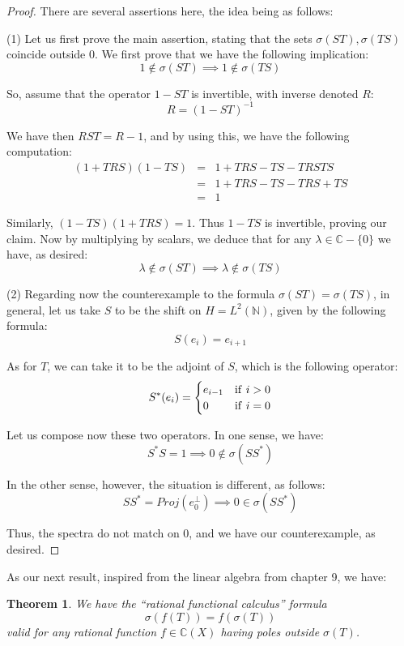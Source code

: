 \documentclass[12pt]{amsbook}
\newtheorem{theorem}{Theorem}[chapter]
\begin{document}
\begin{proof}
There are several assertions here, the idea being as follows:

\medskip

(1) Let us first prove the main assertion, stating that the sets $\sigma(ST),\sigma(TS)$ coincide outside 0. We first prove that we have the following implication:
$$1\notin\sigma(ST)\implies1\notin\sigma(TS)$$

So, assume that the operator $1-ST$ is invertible, with inverse denoted $R$:
$$R=(1-ST)^{-1}$$

We have then $RST=R-1$, and by using this, we have the following computation:
\begin{eqnarray*}
(1+TRS)(1-TS)
&=&1+TRS-TS-TRSTS\\
&=&1+TRS-TS-TRS+TS\\
&=&1
\end{eqnarray*}

Similarly, $(1-TS)(1+TRS)=1$. Thus $1-TS$ is invertible, proving our claim. Now by multiplying by scalars, we deduce that for any $\lambda\in\mathbb C-\{0\}$ we have, as desired:
$$\lambda\notin\sigma(ST)\implies\lambda\notin\sigma(TS)$$

(2) Regarding now the counterexample to the formula $\sigma(ST)=\sigma(TS)$, in general, let us take $S$ to be the shift on $H=L^2(\mathbb N)$, given by the following formula:
$$S(e_i)=e_{i+1}$$

As for $T$, we can take it to be the adjoint of $S$, which is the following operator:
$$S^*(e_i)=\begin{cases}
e_{i-1}&{\rm if}\ i>0\\
0&{\rm if}\ i=0
\end{cases}$$

Let us compose now these two operators. In one sense, we have:
$$S^*S=1\implies 0\notin\sigma(SS^*)$$

In the other sense, however, the situation is different, as follows:
$$SS^*=Proj(e_0^\perp)\implies 0\in\sigma(SS^*)$$

Thus, the spectra do not match on $0$, and we have our counterexample, as desired.
\end{proof}

As our next result, inspired from the linear algebra from chapter 9, we have:


\begin{theorem}
We have the ``rational functional calculus'' formula
$$\sigma(f(T))=f(\sigma(T))$$
valid for any rational function $f\in\mathbb C(X)$ having poles outside $\sigma(T)$.
\end{theorem}
\end{document}
